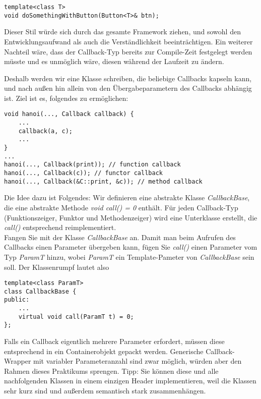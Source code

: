 \documentclass[
  accentcolor=tud1c,	%
  colorbacktitle,		%
  inverttitle,			%
  german,				%
  twoside
]{tudexercise}
\begin{document}
\begin{enumerate}
\begin{lstlisting}
template<class T>
void doSomethingWithButton(Button<T>& btn);
\end{lstlisting}

Dieser Stil würde sich durch das gesamte Framework ziehen, und sowohl den Entwicklungsaufwand als auch die Verständlichkeit beeinträchtigen. Ein weiterer Nachteil wäre, dass der Callback-Typ bereits zur Compile-Zeit festgelegt werden müsste und es unmöglich wäre, diesen während der Laufzeit zu ändern.

Deshalb werden wir eine Klasse schreiben, die beliebige Callbacks kapseln kann, und nach außen hin allein von den Übergabeparametern des Callbacks abhängig ist. Ziel ist es, folgendes zu ermöglichen:
\begin{lstlisting}
void hanoi(..., Callback callback) {
	...
	callback(a, c);
	...
}
...
hanoi(..., Callback(print)); // function callback
hanoi(..., Callback(c)); // functor callback
hanoi(..., Callback(&C::print, &c)); // method callback
\end{lstlisting} 

Die Idee dazu ist Folgendes: Wir definieren eine abstrakte Klasse  \emph{CallbackBase}, die eine abstrakte Methode \emph{void call() = 0} enthält. Für jeden Callback-Typ (Funktionszeiger, Funktor und Methodenzeiger) wird eine Unterklasse erstellt, die \emph{call()} entsprechend reimplementiert. \\

Fangen Sie mit der Klasse \emph{CallbackBase} an. Damit man beim Aufrufen des Callbacks einen Parameter übergeben kann, fügen Sie \emph{call()} einen Parameter vom Typ \emph{ParamT} hinzu, wobei \emph{ParamT} ein Template-Pameter von \emph{CallbackBase} sein soll. Der Klassenrumpf lautet also

\begin{lstlisting}
template<class ParamT>
class CallbackBase {
public:
	...
	virtual void call(ParamT t) = 0;
};
\end{lstlisting} 

Falls ein Callback eigentlich mehrere Parameter erfordert, müssen diese entsprechend in ein Containerobjekt gepackt werden. Generische Callback-Wrapper mit variabler Parameteranzahl sind zwar möglich, würden aber den Rahmen dieses Praktikums sprengen.
 Tipp: Sie können diese und alle nachfolgenden Klassen in einem einzigen Header implementieren, weil die Klassen sehr kurz sind und außerdem semantisch stark zusammenhängen. \\


\end{enumerate}
\end{document}
